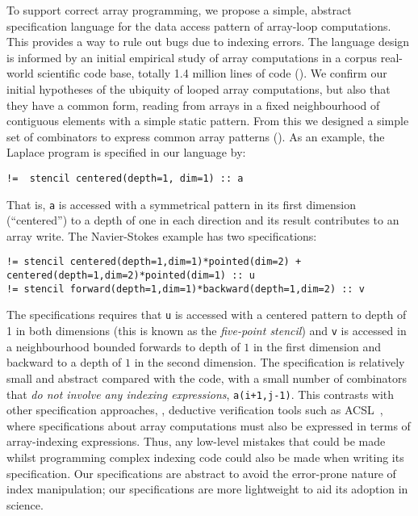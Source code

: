 To support correct array programming, we propose a simple,
abstract specification language for the data access pattern of
array-loop computations. This provides a way to rule out bugs due to
indexing errors. The language design is informed by an initial
empirical study of array computations in a corpus real-world
scientific code base, totally 1.4 million lines of
code (). We confirm our initial hypotheses of the
ubiquity of looped array computations, but also that they have a
common form, reading from arrays in a fixed neighbourhood of
contiguous elements with a simple static pattern. From this we
designed a simple set of combinators to express common array patterns ().
As an example, the Laplace program is specified in our language by:
%
\begin{verbatim}
!=  stencil centered(depth=1, dim=1) :: a
\end{verbatim}
%
That is, \texttt{a} is accessed with a symmetrical pattern in its
first dimension (``centered'') to a depth of one in each direction and
its result contributes to an array
write.  The Navier-Stokes example has two specifications:
%
\begin{verbatim}
!= stencil centered(depth=1,dim=1)*pointed(dim=2) + centered(depth=1,dim=2)*pointed(dim=1) :: u
!= stencil forward(depth=1,dim=1)*backward(depth=1,dim=2) :: v
\end{verbatim}
%
The specifications requires that \texttt{u}
is accessed with a centered pattern to depth of 1 in both dimensions
(this is known as the \emph{five-point stencil}) and \texttt{v} is
accessed in a neighbourhood bounded forwards to depth of $1$ in the
first dimension and backward to a depth of $1$ in the second
dimension. The specification is relatively small and abstract compared
with the code, with a small number of combinators that \emph{do not
  involve any indexing expressions}, \eg{} \texttt{a(i+1,j-1)}. This
contrasts with other specification approaches, \eg{}, deductive
verification tools such as ACSL~\citet{baudin2008acsl}, where
specifications about array computations must also be expressed in
terms of array-indexing expressions. Thus, any low-level mistakes that
could be made whilst programming complex indexing code could also be
made when writing its specification. Our specifications are 
abstract to avoid the error-prone nature of index manipulation; our
specifications are more lightweight to aid its adoption in science.
  
